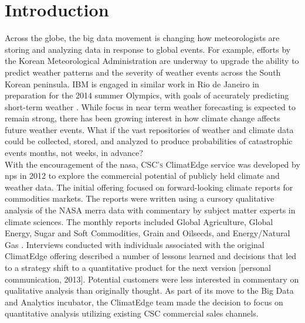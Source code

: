 \section{Introduction}
Across the globe, the big data movement is changing how meteorologists are storing and analyzing data in response to global events. For example, efforts by the Korean Meteorological Administration are underway to upgrade the ability to predict weather patterns and the severity of weather events across the South Korean peninsula. IBM is engaged in similar work in Rio de Janeiro in preparation for the 2014 summer Olympics, with goals of accurately predicting short-term weather \cite{rwe}. While focus in near term weather forecasting is expected to remain strong, there has been growing interest in how climate change affects future weather events. What if the vast repositories of weather and climate data could be collected, stored, and analyzed to produce probabilities of catastrophic events months, not weeks, in advance?\\

With the encouragement of the \gls{nasa}, \textsc{CSC's} ClimatEdge service was developed by \gls{nps} in 2012 to explore the commercial potential of publicly held climate and weather data. The initial offering focused on forward-looking climate reports for commodities markets. The reports were written using a cursory qualitative analysis of the NASA \gls{merra} data with commentary by subject matter experts in climate sciences. The monthly reports included Global Agriculture, Global Energy, Sugar and Soft Commodities, Grain and Oilseeds, and Energy/Natural Gas \cite{climatedgeurl}. Interviews conducted with individuals associated with the original ClimatEdge offering described a number of lessons learned and decisions that led to a strategy shift to a quantitative product for the next version [personal communication, 2013]. Potential customers were less interested in commentary on qualitative analysis than originally thought. As part of its move to the Big Data and Analytics incubator, the ClimatEdge team made the decision to focus on quantitative analysis utilizing existing CSC commercial sales channels.\\

